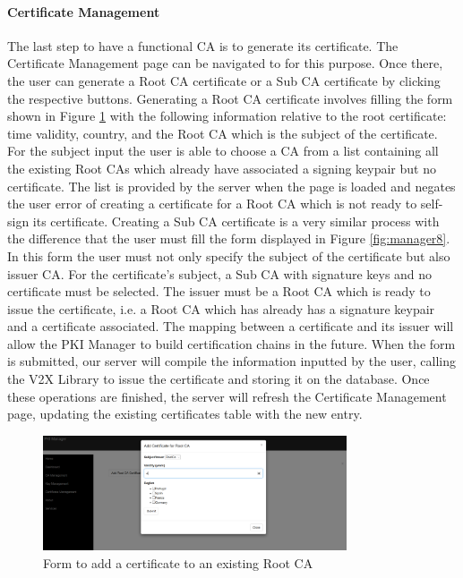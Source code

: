 \paragraph{Certificate Management}
The last step to have a functional CA is to generate its certificate. The Certificate Management page can be navigated to for this purpose. Once there, the user can generate a Root CA certificate or a Sub CA certificate by clicking the respective buttons. Generating a Root CA certificate involves filling the form shown in Figure \ref{fig:manager7} with the following information relative to the root certificate: time validity, country, and the Root CA which is the subject of the certificate. For the subject input the user is able to choose a CA from a list containing all the existing Root CAs which already have associated a signing keypair but no certificate. The list is provided by the server when the page is loaded and negates the user error of creating a certificate for a Root CA which is not ready to self-sign its certificate. Creating a Sub CA certificate is a very similar process with the difference that the user must fill the form displayed in Figure \ref{fig:manager8}. In this form the user must not only specify the subject of the certificate but also issuer CA. For the certificate's subject, a Sub CA with signature keys and no certificate must be selected. The issuer must be a Root CA which is ready to issue the certificate, i.e. a Root CA which has already has a signature keypair and a certificate associated. The mapping between a certificate and its issuer will allow the PKI Manager to build certification chains in the future. When the form is submitted, our server will compile the information inputted by the user, calling the V2X Library to issue the certificate and storing it on the database. Once these operations are finished, the server will refresh the Certificate Management page, updating the existing certificates table with the new entry. 

\begin{figure}
	\centering
	\includegraphics[width=0.8\textwidth]{Figures/manager7}
	\caption{\label{fig:manager7}Form to add a certificate to an existing Root CA}
\end{figure}

